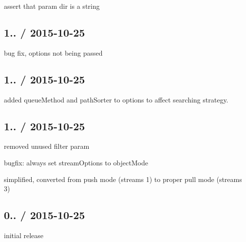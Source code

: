 \begin{DoxyItemize}
\item assert that param {\ttfamily dir} is a {\ttfamily string}
\end{DoxyItemize}

\subsection*{1.. / 2015-\/10-\/25 }


\begin{DoxyItemize}
\item bug fix, options not being passed
\end{DoxyItemize}

\subsection*{1.. / 2015-\/10-\/25 }


\begin{DoxyItemize}
\item added {\ttfamily queue\+Method} and {\ttfamily path\+Sorter} to {\ttfamily options} to affect searching strategy.
\end{DoxyItemize}

\subsection*{1.. / 2015-\/10-\/25 }


\begin{DoxyItemize}
\item removed unused {\ttfamily filter} param
\item bugfix\+: always set {\ttfamily stream\+Options} to {\ttfamily object\+Mode}
\item simplified, converted from push mode (streams 1) to proper pull mode (streams 3)
\end{DoxyItemize}

\subsection*{0.. / 2015-\/10-\/25 }


\begin{DoxyItemize}
\item initial release 
\end{DoxyItemize}